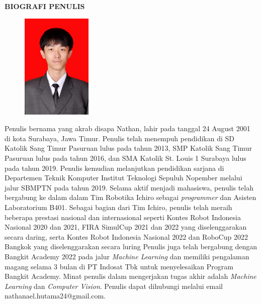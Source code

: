 \begin{center}
  \Large
  \textbf{BIOGRAFI PENULIS}
\end{center}


\vspace{2ex}

\begin{figure}
  \centering
  \vspace{-3ex}
  \includegraphics[width=0.3\textwidth]{gambar/nathan.jpg}
  \vspace{-4ex}
\end{figure}

Penulis bernama \name{} yang akrab disapa Nathan, lahir pada tanggal 24 August 2001 di kota Surabaya, Jawa Timur.
Penulis telah menempuh pendidikan di SD Katolik Sang Timur Pasuruan lulus pada tahun 2013, SMP Katolik Sang Timur Pasuruan lulus pada tahun 2016, dan SMA Katolik St. Louis 1 Surabaya lulus pada tahun 2019.
Penulis kemudian melanjutkan pendidikan sarjana di Departemen Teknik Komputer Institut Teknologi Sepuluh Nopember melalui jalur SBMPTN pada tahun 2019.
Selama aktif menjadi mahasiswa, penulis telah bergabung ke dalam dalam Tim Robotika Ichiro sebagai \textit{programmer} dan Asisten Laboratorium B401.
Sebagai bagian dari Tim Ichiro, penulis telah meraih beberapa prestasi nasional dan internasional seperti Kontes Robot Indonesia Nasional 2020 dan 2021, FIRA SimulCup 2021 dan 2022 yang diselenggarakan secara daring,
serta Kontes Robot Indonesia Nasional 2022 dan RoboCup 2022 Bangkok yang diselenggarakan secara luring
Penulis juga telah bergabung dengan Bangkit Academy 2022 pada jalur \textit{Machine Learning} dan memiliki pengalaman magang selama 3 bulan di PT Indosat Tbk untuk menyelesaikan Program Bangkit Academy.
Minat penulis dalam mengerjakan tugas akhir adalah \textit{Machine Learning} dan \textit{Computer Vision}. Penulis dapat dihubungi melalui email nathanael.hutama24@gmail.com.